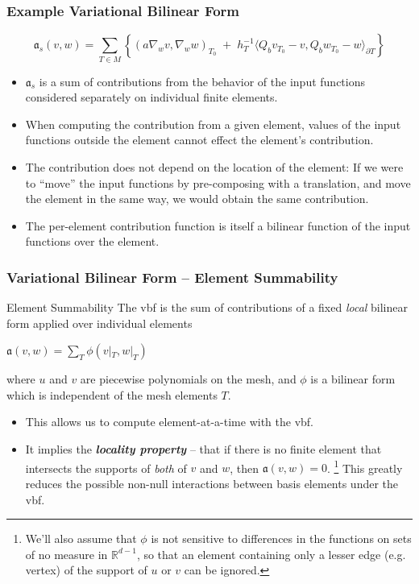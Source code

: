 \documentclass[compress]{beamer}
\begin{document}
\begin{frame}
  \frametitle{Example Variational Bilinear Form}
  $$\mathfrak a_s(v,w) = \sum_{T \in M} \left\{ (a \nabla_w v,\nabla_w w)_{\scriptscriptstyle T_0} \;+\;
    h_T^{-1}\langle Q_b v_{\scriptscriptstyle T_0} - v,Q_b w_{\scriptscriptstyle T_0} - w \rangle_{\partial T} \right\}$$
  \pause
  \begin{itemize}[<+->]
    \item $\mathfrak a_s$ is a sum of contributions from the behavior of the input functions considered
      separately on individual finite elements.
    \item When computing the contribution from a given element, values of the input functions outside the element cannot effect the
      element's contribution.
    \item The contribution does not depend on the location of the element:  If we were to ``move'' the input functions by
      pre-composing with a translation, and move the element in the same way, we would obtain the same contribution.
    \item The per-element contribution function is itself a bilinear function of the input functions over the element.
  \end{itemize}
\end{frame}

\begin{frame}
  \frametitle{Variational Bilinear Form -- Element Summability}
  \begin{block}{Element Summability}
    The vbf is the sum of contributions of a fixed \emph{local} bilinear form applied over individual elements
    \begin{center}$\mathfrak{a}(v,w) = \sum_T { \phi(v|_T,w|_T) }$\end{center}
      where $u$ and $v$ are piecewise polynomials on the mesh, and $\phi$ is a bilinear form which is independent of the mesh elements $T$.
  \end{block}
  \pause
  \begin{itemize}[<+->]
    \item This allows us to compute element-at-a-time with the vbf.
    \item It implies the \emph{\textbf{locality property}} -- that if there is no finite element that intersects the supports of \emph{both}
      of $v$ and $w$, then $\mathfrak{a}(v,w) = 0$.
        \footnote{We'll also assume that $\phi$ is not sensitive to differences in the functions on sets of no measure in $\mathbb{R}^{d-1}$,
                  so that an element containing only a lesser edge (e.g. vertex) of the support of $u$ or $v$ can be ignored.}
      This greatly reduces the possible non-null interactions between basis elements under the vbf.
  \end{itemize}
\end{frame}
\end{document}
